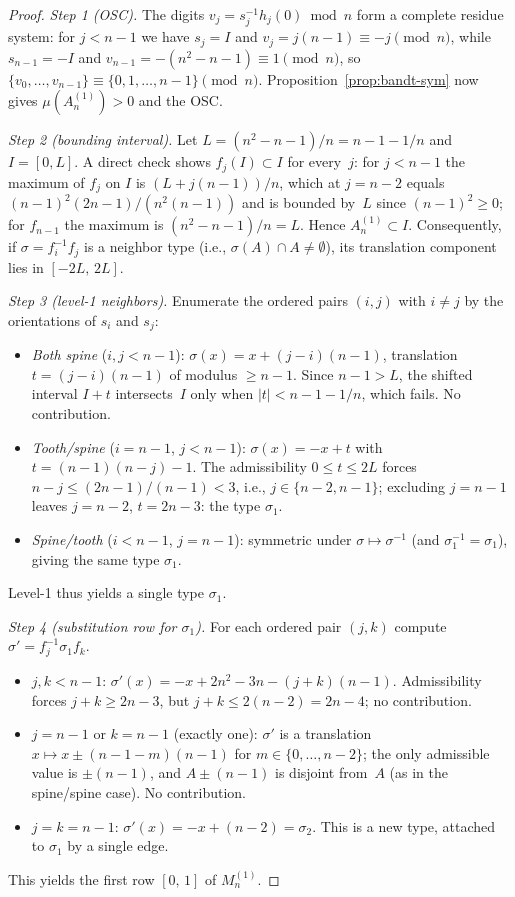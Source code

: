 \documentclass{amsart}
\theoremstyle{definition}
\theoremstyle{remark}
\begin{document}
\begin{proof}
\emph{Step 1 (OSC).}  The digits
$v_j = s_j^{-1} h_j(0) \bmod n$
form a complete residue system: for $j < n{-}1$ we have $s_j = I$
and $v_j = j(n{-}1) \equiv -j \pmod n$, while $s_{n-1} = -I$ and
$v_{n-1} = -(n^2{-}n{-}1) \equiv 1 \pmod n$, so
$\{v_0, \ldots, v_{n-1}\} \equiv \{0, 1, \ldots, n{-}1\} \pmod n$.
Proposition~\ref{prop:bandt-sym} now gives $\mu(A_n^{(1)}) > 0$
and the OSC.

\emph{Step 2 (bounding interval).}  Let
$L = (n^2{-}n{-}1)/n = n{-}1-1/n$ and $I = [0, L]$.  A direct
check shows $f_j(I) \subset I$ for every~$j$: for $j < n{-}1$ the
maximum of $f_j$ on $I$ is $(L + j(n{-}1))/n$, which at
$j = n{-}2$ equals $(n{-}1)^2 (2n{-}1) / (n^2(n{-}1))$ and is
bounded by~$L$ since $(n{-}1)^2 \ge 0$; for $f_{n-1}$ the
maximum is $(n^2{-}n{-}1)/n = L$.  Hence $A_n^{(1)} \subset I$.
Consequently, if $\sigma = f_i^{-1} f_j$ is a neighbor type
(i.e., $\sigma(A) \cap A \neq \emptyset$), its translation
component lies in $[-2L,\, 2L]$.

\emph{Step 3 (level-1 neighbors).}  Enumerate the ordered pairs
$(i, j)$ with $i \neq j$ by the orientations of $s_i$ and $s_j$:
\begin{itemize}
\item \emph{Both spine} ($i, j < n{-}1$):
  $\sigma(x) = x + (j{-}i)(n{-}1)$, translation
  $t = (j{-}i)(n{-}1)$ of modulus $\ge n{-}1$.  Since
  $n{-}1 > L$, the shifted interval $I + t$ intersects~$I$ only
  when $|t| < n{-}1-1/n$, which fails.  No contribution.
\item \emph{Tooth/spine} ($i = n{-}1$, $j < n{-}1$):
  $\sigma(x) = -x + t$ with
  $t = (n{-}1)(n{-}j) - 1$.  The admissibility
  $0 \le t \le 2L$ forces $n - j \le (2n{-}1)/(n{-}1) < 3$, i.e.,
  $j \in \{n{-}2, n{-}1\}$; excluding $j = n{-}1$ leaves $j = n{-}2$,
  $t = 2n{-}3$: the type $\sigma_1$.
\item \emph{Spine/tooth} ($i < n{-}1$, $j = n{-}1$): symmetric
  under $\sigma \mapsto \sigma^{-1}$ (and $\sigma_1^{-1} = \sigma_1$),
  giving the same type $\sigma_1$.
\end{itemize}
Level-1 thus yields a single type $\sigma_1$.

\emph{Step 4 (substitution row for $\sigma_1$).}  For each ordered
pair $(j, k)$ compute $\sigma' = f_j^{-1} \sigma_1 f_k$.
\begin{itemize}
\item $j, k < n{-}1$: $\sigma'(x) = -x + 2n^2 - 3n - (j+k)(n{-}1)$.
  Admissibility forces $j + k \ge 2n{-}3$, but
  $j + k \le 2(n{-}2) = 2n{-}4$; no contribution.
\item $j = n{-}1$ or $k = n{-}1$ (exactly one): $\sigma'$ is a
  translation $x \mapsto x \pm (n{-}1-m)(n{-}1)$ for
  $m \in \{0, \ldots, n{-}2\}$; the only admissible value is
  $\pm(n{-}1)$, and $A \pm (n{-}1)$ is disjoint from~$A$ (as
  in the spine/spine case).  No contribution.
\item $j = k = n{-}1$: $\sigma'(x) = -x + (n{-}2) = \sigma_2$.
  This is a new type, attached to $\sigma_1$ by a single edge.
\end{itemize}
This yields the first row $[0,\, 1]$ of $M_n^{(1)}$.


\end{proof}
\end{document}
